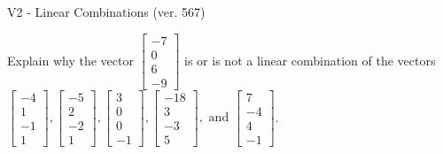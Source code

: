 \begin{exercise}
  \begin{exerciseTitle}V2 - Linear Combinations (ver. 567)\end{exerciseTitle}
  \begin{exerciseStatement}
    Explain why the vector \(\left[\begin{array}{c}
-7 \\
0 \\
6 \\
-9
\end{array}\right]\)  is or is not a linear 
	combination of the vectors \(\left[\begin{array}{c}
-4 \\
1 \\
-1 \\
1
\end{array}\right] , \left[\begin{array}{c}
-5 \\
2 \\
-2 \\
1
\end{array}\right] , \left[\begin{array}{c}
3 \\
0 \\
0 \\
-1
\end{array}\right] , \left[\begin{array}{c}
-18 \\
3 \\
-3 \\
5
\end{array}\right] , \text{ and } \left[\begin{array}{c}
7 \\
-4 \\
4 \\
-1
\end{array}\right]\).
	



\end{exerciseStatement}
\end{exercise}

